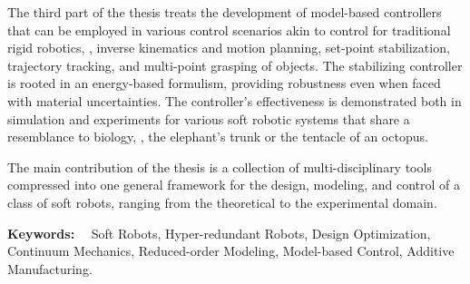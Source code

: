 The third part of the thesis treats the development of model-based controllers that can be employed in various control scenarios akin to control for traditional rigid robotics, \eg, inverse kinematics and motion planning, set-point stabilization, trajectory tracking, and multi-point grasping of objects. The stabilizing controller is rooted in an energy-based formulism, providing robustness even when faced with material uncertainties. The controller's effectiveness is demonstrated both in simulation and experiments for various soft robotic systems that share a resemblance to biology, \eg, the elephant's trunk or the tentacle of an octopus.

The main contribution of the thesis is a collection of multi-disciplinary tools compressed into one general framework for the design, modeling, and control of a class of soft robots, ranging from the theoretical to the experimental domain.

\vspace*{5pt}\noindent
\textbf{Keywords:} \ \ Soft Robots, Hyper-redundant Robots, Design Optimization, Continuum Mechanics, Reduced-order Modeling, Model-based Control, Additive Manufacturing.
